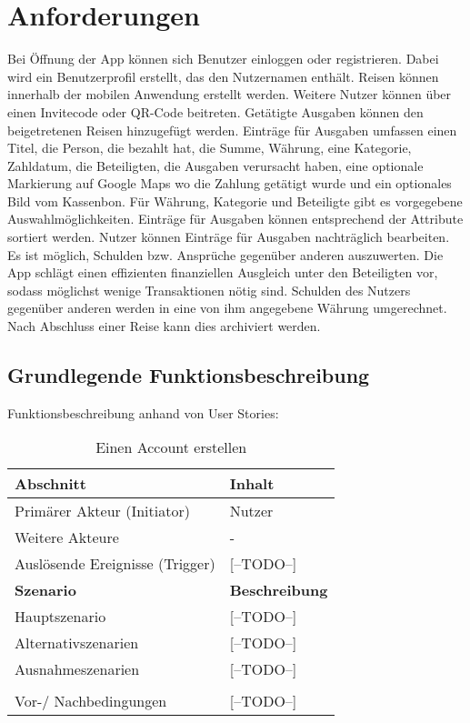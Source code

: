 \section{Anforderungen}

Bei Öffnung der App können sich Benutzer einloggen oder registrieren.
Dabei wird ein Benutzerprofil erstellt, das den Nutzernamen enthält.
Reisen können innerhalb der mobilen Anwendung erstellt werden.
Weitere Nutzer können über einen Invitecode oder QR-Code beitreten.
Getätigte Ausgaben können den beigetretenen Reisen hinzugefügt werden.
Einträge für Ausgaben umfassen einen Titel, die Person, die bezahlt hat, die Summe,
Währung, eine Kategorie, Zahldatum, die Beteiligten, die Ausgaben verursacht haben,
eine optionale Markierung auf Google Maps wo die Zahlung getätigt wurde und ein optionales Bild vom Kassenbon.
Für Währung, Kategorie und Beteiligte gibt es vorgegebene Auswahlmöglichkeiten.
Einträge für Ausgaben können entsprechend der Attribute sortiert werden.
Nutzer können Einträge für Ausgaben nachträglich bearbeiten.
Es ist möglich, Schulden bzw. Ansprüche gegenüber anderen auszuwerten.
Die App schlägt einen effizienten finanziellen Ausgleich unter den Beteiligten vor, sodass möglichst wenige Transaktionen nötig sind.
Schulden des Nutzers gegenüber anderen werden in eine von ihm angegebene Währung umgerechnet.
Nach Abschluss einer Reise kann dies archiviert werden.

\subsection{Grundlegende Funktionsbeschreibung}

Funktionsbeschreibung anhand von User Stories:

\begin{table}[H]
	\caption{Einen Account erstellen}
	\begin{tabularx}{0.95\textwidth}{ |X|X| }
		\hline
		\rowcolor{gray} \textbf{Abschnitt}     & \textbf{Inhalt}       \\
		\hline
		Primärer Akteur (Initiator)            & Nutzer                \\
		\hline
		Weitere Akteure                        & -                     \\
		\hline
		Auslösende Ereignisse (Trigger)        & [--TODO--]            \\
		\hline
		\rowcolor{lightgray} \textbf{Szenario} & \textbf{Beschreibung} \\
		\hline
		Hauptszenario                          & [--TODO--]            \\
		\hline
		Alternativszenarien                    & [--TODO--]            \\
		\hline
		Ausnahmeszenarien                      & [--TODO--]            \\
		\hline
		\rowcolor{lightgray}                   &                       \\
		\hline
		Vor-/ Nachbedingungen                  & [--TODO--]            \\
		\hline
	\end{tabularx}
\end{table}


